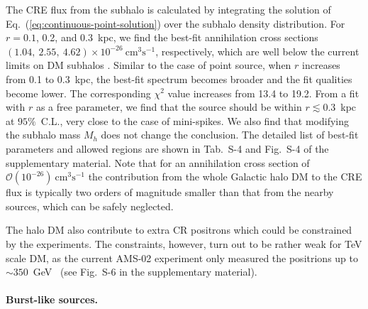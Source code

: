 \documentclass[aps,prl,twocolumn,a4paper]{revtex4}
\newcommand{\note}[1]{#1}{\ignorespacesafterend}
\newcommand{\eq}[1]{Eq.~(\ref{#1})}
\newcommand{\tx}[1]{\text{#1}}
\begin{document}
The CRE flux from the subhalo is calculated by integrating the solution of 
\eq{eq:continuous-point-solution} over the subhalo density distribution.
For $r=0.1$, 0.2, and 0.3~kpc,
we find  the best-fit annihilation cross sections 
$(1.04, \ 2.55,\  4.62)\times 10^{-26}~\mbox{cm}^{3}\text{s}^{-1}$, respectively,
which are well below  the current limits on DM subhalos
\cite{
	Fermi-LAT:2016uux,%
	Schoonenberg:2016aml,%
	Hooper:2016cld%
}.
Similar to the case of point source, 
when $r$ increases from 0.1 to 0.3~kpc, 
the best-fit spectrum becomes broader and the fit qualities become lower.
The corresponding $\chi^{2}$ value increases from 13.4 to  19.2.
From a fit with $r$ as a free parameter, 
we find that  the source should be within $r \lesssim 0.3$~kpc at $95\%$~C.L., 
very close to the case of mini-spikes.
We also find that modifying the subhalo mass $M_{h}$ 
does not change the conclusion.
%
The detailed list of best-fit parameters and allowed regions
are shown in Tab.~S-4 and Fig.~S-4
of the supplementary material. 
%
Note that 
for  an  annihilation cross section of 
$\mathcal{O}(10^{-26})~\tx{cm}^{3}\tx{s}^{-1}$ %
the contribution from the whole Galactic halo DM 
to the CRE flux  is typically two orders of magnitude  smaller than 
that from the nearby sources,
which can be safely neglected.
%
\note{
The halo DM also contribute to extra CR positrons which 
could be constrained by the experiments.
The constraints, however, turn out to be rather weak for 
TeV scale DM, 
as the current AMS-02  experiment only measured the 
positrions up to 
$\sim 350$~GeV~\cite{Accardo:2014lma}
%
(see Fig.~S-6 in the supplementary material).
}






\paragraph{\bf Burst-like  sources.}
\end{document}
